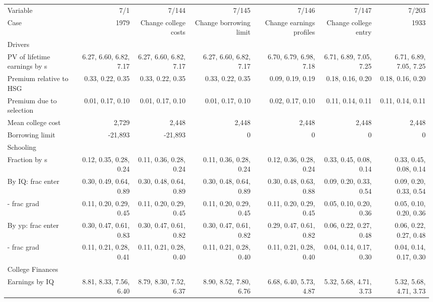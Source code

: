 \begin{tabular}{lrrrrrr}
\hline
Variable & 7/1  & 7/144  & 7/145  & 7/146  & 7/147  & 7/203  \\ 
Case & 1979  & Change college costs  & Change borrowing limit  & Change earnings profiles  & Change college entry  & 1933  \\ 
Drivers &   &   &   &   &   &   \\ 
PV of lifetime earnings by s & 6.27, 6.60, 6.82, 7.17  & 6.27, 6.60, 6.82, 7.17  & 6.27, 6.60, 6.82, 7.17  & 6.70, 6.79, 6.98, 7.18  & 6.71, 6.89, 7.05, 7.25  & 6.71, 6.89, 7.05, 7.25  \\ 
Premium relative to HSG & 0.33, 0.22, 0.35  & 0.33, 0.22, 0.35  & 0.33, 0.22, 0.35  & 0.09, 0.19, 0.19  & 0.18, 0.16, 0.20  & 0.18, 0.16, 0.20  \\ 
Premium due to selection & 0.01, 0.17, 0.10  & 0.01, 0.17, 0.10  & 0.01, 0.17, 0.10  & 0.02, 0.17, 0.10  & 0.11, 0.14, 0.11  & 0.11, 0.14, 0.11  \\ 
Mean college cost & 2,729  & 2,448  & 2,448  & 2,448  & 2,448  & 2,448  \\ 
Borrowing limit & -21,893  & -21,893  & 0  & 0  & 0  & 0  \\ 
\hline
Schooling &   &   &   &   &   &   \\ 
Fraction by s & 0.12, 0.35, 0.28, 0.24  & 0.11, 0.36, 0.28, 0.24  & 0.11, 0.36, 0.28, 0.24  & 0.12, 0.36, 0.28, 0.24  & 0.33, 0.45, 0.08, 0.14  & 0.33, 0.45, 0.08, 0.14  \\ 
By IQ: frac enter & 0.30, 0.49, 0.64, 0.89  & 0.30, 0.48, 0.64, 0.89  & 0.30, 0.48, 0.64, 0.89  & 0.30, 0.48, 0.63, 0.88  & 0.09, 0.20, 0.33, 0.54  & 0.09, 0.20, 0.33, 0.54  \\ 
- frac grad & 0.11, 0.20, 0.29, 0.45  & 0.11, 0.20, 0.29, 0.45  & 0.11, 0.20, 0.29, 0.45  & 0.11, 0.20, 0.29, 0.45  & 0.05, 0.10, 0.20, 0.36  & 0.05, 0.10, 0.20, 0.36  \\ 
By yp: frac enter & 0.30, 0.47, 0.61, 0.83  & 0.30, 0.47, 0.61, 0.82  & 0.30, 0.47, 0.61, 0.82  & 0.29, 0.47, 0.61, 0.82  & 0.06, 0.22, 0.27, 0.48  & 0.06, 0.22, 0.27, 0.48  \\ 
- frac grad & 0.11, 0.21, 0.28, 0.41  & 0.11, 0.21, 0.28, 0.40  & 0.11, 0.21, 0.28, 0.40  & 0.11, 0.21, 0.28, 0.40  & 0.04, 0.14, 0.17, 0.30  & 0.04, 0.14, 0.17, 0.30  \\ 
\hline
College Finances &   &   &   &   &   &   \\ 
Earnings by IQ & 8.81, 8.33, 7.56, 6.40  & 8.79, 8.30, 7.52, 6.37  & 8.90, 8.52, 7.80, 6.76  & 6.68, 6.40, 5.73, 4.87  & 5.32, 5.68, 4.71, 3.73  & 5.32, 5.68, 4.71, 3.73  \\ 

\end{tabular}
